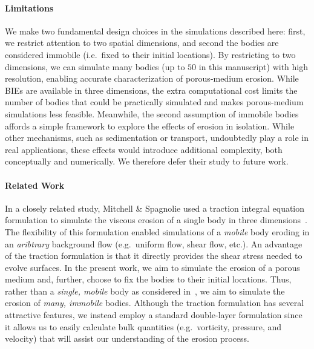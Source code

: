 \documentclass[preprint, 10pt]{elsarticle}
\begin{document}
\paragraph{Limitations}
We make two fundamental design choices in the simulations described here: first, we restrict attention to two spatial dimensions, and second the bodies are considered immobile (i.e.~fixed to their initial locations). By restricting to two dimensions, we can simulate many bodies (up to $50$ in this manuscript) with high resolution, enabling accurate characterization of porous-medium erosion. While BIEs are available in three dimensions, the extra computational cost limits the number of bodies that could be practically simulated and makes porous-medium simulations less feasible. Meanwhile, the second assumption of immobile bodies affords a simple framework to explore the effects of erosion in isolation. While other mechanisms, such as sedimentation or transport, undoubtedly play a role in real applications, these effects would introduce additional complexity, both conceptually and numerically. We therefore defer their study to future work.

\paragraph{Related Work}
In a closely related study, Mitchell \& Spagnolie used a traction integral equation formulation to simulate the viscous erosion of a single body in three dimensions~\cite{mit-spa2016}. The flexibility of this formulation enabled simulations of a {\em mobile} body eroding in an {\em aribtrary} background flow (e.g.~uniform flow, shear flow, etc.).  An advantage of the traction formulation is that it directly provides the shear stress needed to evolve surfaces.  In the present work, we aim to simulate the erosion of a porous medium and, further, choose to fix the bodies to their initial locations. Thus, rather than a {\em single, mobile} body as considered in~\cite{mit-spa2016}, we aim to simulate the erosion of {\em many, immobile} bodies. Although the traction formulation has several attractive features, we instead employ a standard double-layer formulation since it allows us to easily calculate bulk quantities (e.g.~vorticity, pressure, and velocity) that will assist our understanding of the erosion process.
\end{document}
